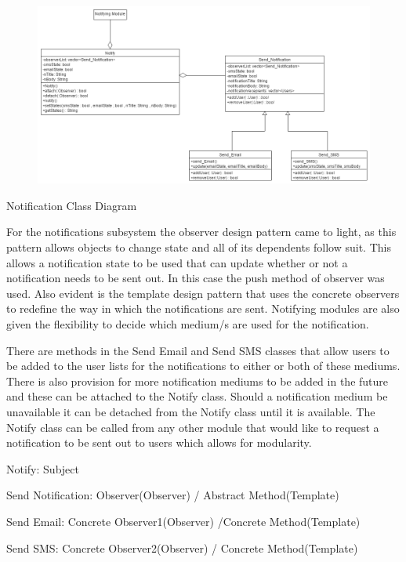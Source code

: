\documentclass{article}
\begin{document}
    \mbox{}\\
    \bigskip
    \clearpage
    
    \begin{figure}[h!]
      \includegraphics[width=\textwidth]{Notifications_Class_Diagram.png}
    \end{figure}
    Notification Class Diagram
    
    \begin{flushleft}
    
        For the notifications subsystem the observer design pattern came to light, as this pattern allows objects to change state and all of its dependents follow suit. This allows a notification state to be used that can update whether or not a notification needs to be sent out. In this case the push method of observer was used. Also evident is the template design pattern that uses the concrete observers to redefine the way in which the notifications are sent. Notifying modules are also given the flexibility to decide which medium/s are used for the notification.
        
        \bigskip

        
        There are methods in the Send Email and Send SMS classes that allow users to be added to the user lists for the notifications to either or both of these mediums. There is also provision for more notification mediums to be added in the future and these can be attached to the Notify class. Should a notification medium be unavailable it can be detached from the Notify class until it is available. The Notify class can be called from any other module that would like to request a notification to be sent out to users which allows for modularity.
        
        \bigskip

        Notify: Subject
        

        Send Notification: Observer(Observer) / Abstract Method(Template)
        

        Send Email: Concrete Observer1(Observer) /Concrete Method(Template)
        

        Send SMS: Concrete Observer2(Observer) / Concrete Method(Template)
    
    \end{flushleft}
    
\end{document}
